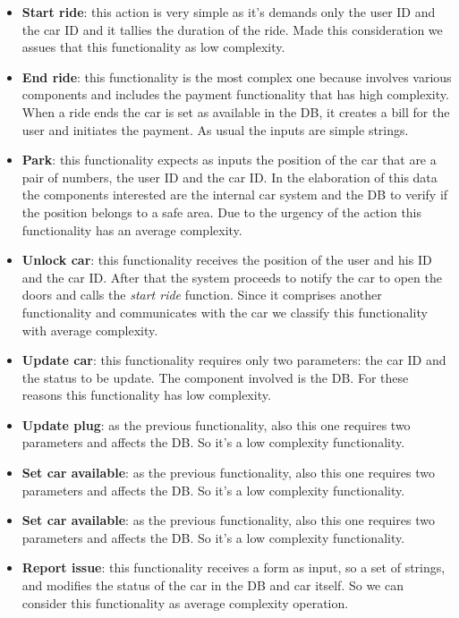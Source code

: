 \documentclass[english]{article}
\begin{document}
\begin{itemize}
	\item{\textbf{Start ride}: this action is very simple as it's demands only the user ID and the car ID and it tallies the duration of the ride. Made this consideration we assues that this functionality as low complexity.}

	\item{\textbf{End ride}: this functionality is the most complex one because involves various components and includes the payment functionality that has high complexity. When a ride ends the car is set as available in the DB, it creates a bill for the user and initiates the payment. As usual the inputs are simple strings.}

	\item{\textbf{Park}: this functionality expects as inputs the position of the car that are a pair of numbers, the user ID and the car ID. In the elaboration of this data the components interested are the internal car system and the DB to verify if the position belongs to a safe area. Due to the urgency of the action this functionality has an average complexity.}

	\item{\textbf{Unlock car}: this functionality receives the position of the user and his ID and the car ID. After that the system proceeds to notify the car to open the doors and calls the \textit{start ride} function. Since it comprises another functionality and communicates with the car we classify this functionality with average complexity.}

	\item{\textbf{Update car}: this functionality requires only two parameters: the car ID and the status to be update. The component involved is the DB. For these reasons this functionality has low complexity.}

	\item{\textbf{Update plug}: as the previous functionality, also this one requires two parameters and affects the DB. So it's a low complexity functionality.}

	\item{\textbf{Set car available}: as the previous functionality, also this one requires two parameters and affects the DB. So it's a low complexity functionality.}

	\item{\textbf{Set car available}: as the previous functionality, also this one requires two parameters and affects the DB. So it's a low complexity functionality.}

	\item{\textbf{Report issue}: this functionality receives a form as input, so a set of strings, and modifies the status of the car in the DB and car itself. So we can consider this functionality as average complexity operation.}
\end{itemize}
\end{document}
